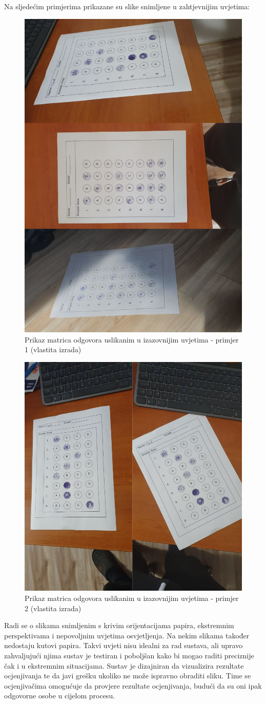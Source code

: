 \documentclass{foi}
\begin{document}
Na sljedećim primjerima prikazane su slike snimljene u zahtjevnijim uvjetima:

\begin{figure}[H]
\centering
\includegraphics[width=0.5\linewidth]{slike/Test3.png}
\caption{Prikaz matrica odgovora uslikanim u izazovnijim uvjetima - primjer 1 (vlastita izrada)}
\end{figure}

\begin{figure}[H]
\centering
\includegraphics[width=0.55\linewidth]{slike/Test4.png}
\caption{Prikaz matrica odgovora uslikanim u izazovnijim uvjetima - primjer 2 (vlastita izrada)}
\end{figure}

Radi se o slikama snimljenim s krivim orijentacijama papira, ekstremnim perspektivama i nepovoljnim uvjetima osvjetljenja. Na nekim slikama također nedostaju kutovi papira. Takvi uvjeti nisu idealni za rad sustava, ali upravo zahvaljujući njima sustav je testiran i poboljšan kako bi mogao raditi preciznije čak i u ekstremnim situacijama. Sustav je dizajniran da vizualizira rezultate ocjenjivanja te da javi grešku ukoliko ne može ispravno obraditi sliku. Time se ocjenjivačima omogućuje da provjere rezultate ocjenjivanja, budući da su oni ipak odgovorne osobe u cijelom procesu.
\end{document}

